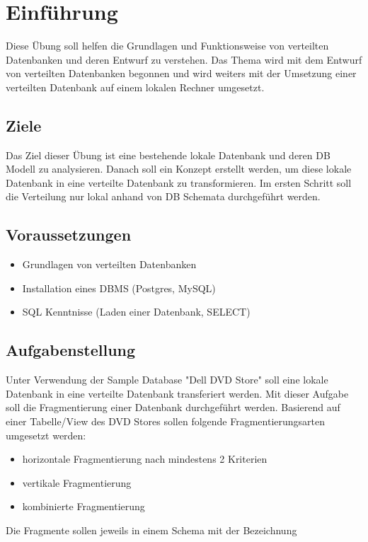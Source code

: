 
\section{Einführung}
Diese Übung soll helfen die Grundlagen und Funktionsweise von verteilten Datenbanken und deren Entwurf zu verstehen. Das Thema wird mit dem Entwurf von verteilten Datenbanken begonnen und wird weiters mit der Umsetzung einer verteilten Datenbank auf einem lokalen Rechner umgesetzt.

\subsection{Ziele}
Das Ziel dieser Übung ist eine bestehende lokale Datenbank und deren DB Modell zu analysieren. Danach soll ein Konzept erstellt werden, um diese lokale Datenbank in eine verteilte Datenbank zu transformieren. Im ersten Schritt soll die Verteilung nur lokal anhand von DB Schemata durchgeführt werden.

\subsection{Voraussetzungen}
\begin{itemize}
	\item Grundlagen von verteilten Datenbanken
	\item Installation eines DBMS (Postgres, MySQL)
	\item SQL Kenntnisse (Laden einer Datenbank, SELECT)
\end{itemize}

\subsection{Aufgabenstellung}
Unter Verwendung der Sample Database "Dell DVD Store" soll eine lokale Datenbank in eine verteilte Datenbank transferiert werden. Mit dieser Aufgabe soll die Fragmentierung einer Datenbank durchgeführt werden. Basierend auf einer Tabelle/View des DVD Stores sollen folgende Fragmentierungsarten umgesetzt werden:

\begin{itemize}
	\item horizontale Fragmentierung nach mindestens 2 Kriterien
	\item vertikale Fragmentierung
	\item kombinierte Fragmentierung
\end{itemize}
Die Fragmente sollen jeweils in einem Schema mit der Bezeichnung

